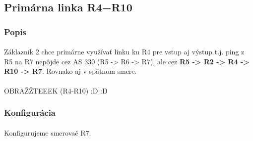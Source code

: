 \documentclass[12pt,twoside,a4paper]{report}
\begin{document}
\subsection{Primárna linka R4−R10}
\subsubsection{Popis}
\paragraph{}
Záklazník 2 chce primárne využívať linku ku R4 pre vstup aj výstup t.j. ping z R5 na R7 nepôjde cez AS 330 (R5 -\textgreater{} R6 -\textgreater{} R7), ale cez \textbf{R5 -\textgreater{} R2 -\textgreater{} R4 -\textgreater{} R10 -\textgreater{} R7}. Rovnako aj v spätnom smere.

\paragraph{}
OBRAŽŽTEEEK (R4-R10) :D :D

\subsubsection{Konfigurácia}
\paragraph{}
Konfigurujeme smerovač R7.
\end{document}
